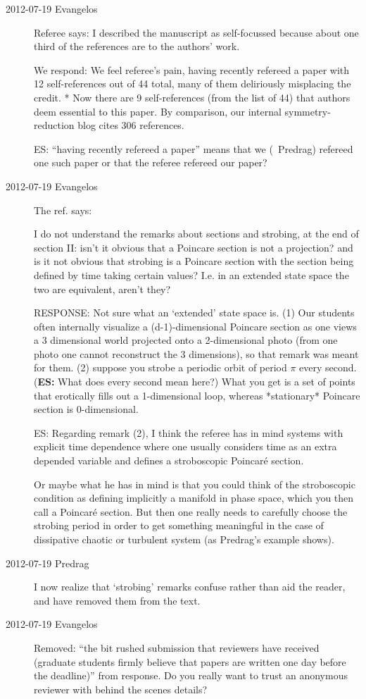 \begin{description}
\item[2012-07-19 Evangelos] Referee says: I described the manuscript as
self-focussed because about one third of the references are to the
authors' work.

We respond:
We feel referee's pain, having recently refereed a paper with 12
self-references out of 44 total, many of them deliriously misplacing the
credit.
*   Now there are 9 self-references (from the list of 44) that authors
    deem essential to this paper. By comparison, our internal
    symmetry-reduction blog cites 306 references.

ES: ``having recently refereed a paper'' means that we (\ie\ Predrag)
refereed one such paper or that the referee refereed our paper?

\item[2012-07-19 Evangelos] The ref. says:

I do not understand the remarks about sections and strobing, at the end
of section II: isn't it obvious that a Poincare section is not a
projection? and is it not obvious that strobing is a Poincare section
with the section being defined by time taking certain values? I.e. in an
extended state space the two are equivalent, aren't they?

RESPONSE: Not sure what an `extended' state space is.
(1) Our students often internally visualize a (d-1)-dimensional Poincare
section as one views a 3 dimensional world projected onto a 2-dimensional
photo (from one photo one cannot reconstruct the 3 dimensions), so that
remark was meant for them.
(2) suppose you strobe a periodic orbit of period $\pi$ every second.
({\bf ES:} What does every second mean here?)
What you get is a set of points that erotically fills out a
1-dimensional loop, whereas *stationary* Poincare section is
0-dimensional.

ES: Regarding remark (2), I think the referee has in mind systems with
explicit time dependence where one usually considers time as an extra
depended variable and defines a stroboscopic Poincar\'e section.

Or maybe what he has in mind is that you could think of the stroboscopic
condition as defining implicitly a manifold in phase space, which you
then call a Poincar\'e section. But then one really needs to carefully
choose the strobing period in order to get something meaningful in the
case of dissipative chaotic or turbulent system (as Predrag's example
shows).

\item[2012-07-19 Predrag]  I now realize that `strobing' remarks confuse
rather than aid the reader, and have removed them from the text.

\item[2012-07-19 Evangelos] Removed: ``the bit rushed submission that
reviewers have received (graduate students firmly believe that papers are
written one day before the deadline)'' from response. Do you really want
to trust an anonymous reviewer with behind the scenes details?

\end{description}


